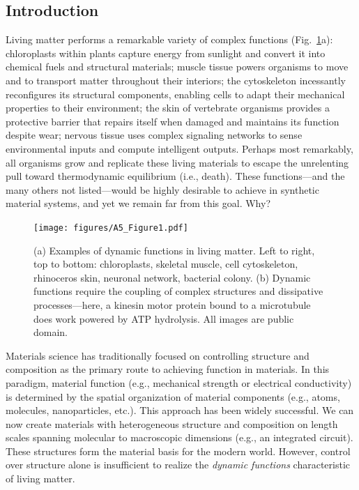 \begin{appendices}
\section{Introduction}

Living matter performs a remarkable variety of complex functions (Fig.~\ref{fig:1}a): chloroplasts within plants capture energy from sunlight and convert it into chemical fuels and structural materials; muscle tissue powers organisms to move and to transport matter throughout their interiors; the cytoskeleton incessantly reconfigures its structural components, enabling cells to adapt their mechanical properties to their environment; the skin of vertebrate organisms provides a protective barrier that repairs itself when damaged and maintains its function despite wear; nervous tissue uses complex signaling networks to sense environmental inputs and compute intelligent outputs.  Perhaps most remarkably, all organisms grow and replicate these living materials to escape the unrelenting pull toward thermodynamic equilibrium (i.e., death). These functions---and the many others not listed---would be highly desirable to achieve in synthetic material systems, and yet we remain far from this goal. Why?

\begin{figure}[!p]
     \centering
     \texttt{[image: figures/A5\_Figure1.pdf]}
     \caption{(a) Examples of dynamic functions in living matter. Left to right, top to bottom: chloroplasts, skeletal muscle, cell cytoskeleton, rhinoceros skin, neuronal network, bacterial colony. (b) Dynamic functions require the coupling of complex structures and dissipative processes---here, a kinesin motor protein bound to a microtubule does work powered by ATP hydrolysis. All images are public domain. }
     \label{fig:1}
 \end{figure}

Materials science has traditionally focused on controlling structure and composition as the primary route to achieving function in materials. In this paradigm, material function (e.g., mechanical strength or electrical conductivity) is determined by the spatial organization of material components (e.g., atoms, molecules, nanoparticles, etc.). This approach has been widely successful. We can now create materials with heterogeneous structure and composition on length scales spanning molecular to macroscopic dimensions (e.g., an integrated circuit).  These structures form the material basis for the modern world. However, control over structure alone is insufficient to realize the \emph{dynamic functions} characteristic of living matter.


\end{appendices}
